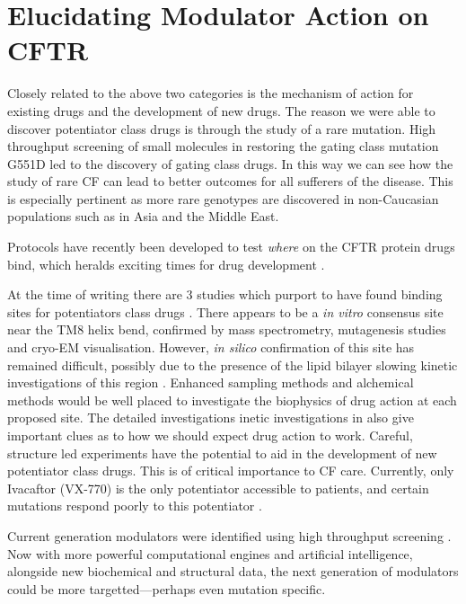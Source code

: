 \section{Elucidating Modulator Action on CFTR}

Closely related to the above two categories is the mechanism of action for existing drugs and the development of new drugs. The reason we were able to discover potentiator class drugs is through the study of a rare mutation. High throughput screening of small molecules in restoring the gating class mutation G551D led to the discovery of gating class drugs. In this way we can see how the study of rare CF can lead to better outcomes for all sufferers of the disease. This is especially pertinent as more rare genotypes are discovered in non-Caucasian populations such as in Asia and the Middle East.  

Protocols have recently been developed to test \textit{where} on the CFTR protein drugs bind, which heralds exciting times for drug development \cite{laselva2022}. 

At the time of writing there are 3 studies which purport to have found binding sites for potentiators class drugs \cite{}. There appears to be a \textit {in vitro} consensus site near the TM8 helix bend, confirmed by mass spectrometry, mutagenesis studies and cryo-EM visualisation. However, \textit{in silico} confirmation of this site has remained difficult, possibly due to the presence of the lipid bilayer slowing kinetic investigations of this region \cite{laselva2021a}. Enhanced sampling methods and alchemical methods would be well placed to investigate the biophysics of drug action at each proposed site. The detailed investigations inetic investigations in \cite{csanady2019} also give important clues as to how we should expect drug action to work. Careful, structure led experiments have the potential to aid in the development of new potentiator class drugs. This is of critical importance to CF care. Currently, only Ivacaftor (VX-770)  is the only potentiator accessible to patients, and certain mutations respond poorly to this potentiator \cite{phuan2018, vangoor2014}. 

Current generation modulators were identified using high throughput screening \cite{vangoor2009}. Now with more powerful computational engines and artificial intelligence, alongside new biochemical and structural data, the next generation of modulators could be more targetted---perhaps even mutation specific.

